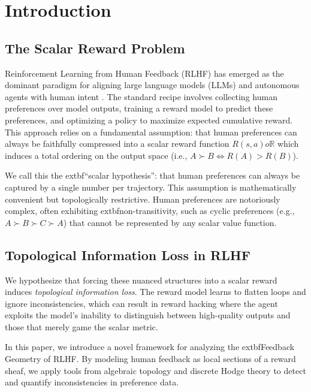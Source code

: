 \section{Introduction}
\label{sec:intro}

\subsection{The Scalar Reward Problem}

Reinforcement Learning from Human Feedback (RLHF) has emerged as the dominant paradigm for aligning large language models (LLMs) and autonomous agents with human intent \citep{christiano2017deep, ouyang2022training}. The standard recipe involves collecting human preferences over model outputs, training a reward model to predict these preferences, and optimizing a policy to maximize expected cumulative reward. This approach relies on a fundamental assumption: that human preferences can always be faithfully compressed into a scalar reward function $R(s,a) 	o \mathbb{R}$ which induces a total ordering on the output space (i.e., $A \succ B \iff R(A) > R(B)$).

We call this the 	extbf{``scalar hypothesis''}: that human preferences can always be captured by a single number per trajectory. This assumption is mathematically convenient but topologically restrictive. Human preferences are notoriously complex, often exhibiting 	extbf{non-transitivity}, such as cyclic preferences (e.g., $A \succ B \succ C \succ A$) that cannot be represented by any scalar value function.

\subsection{Topological Information Loss in RLHF}

We hypothesize that forcing these nuanced structures into a scalar reward induces \emph{topological information loss}. The reward model learns to flatten loops and ignore inconsistencies, which can result in reward hacking where the agent exploits the model's inability to distinguish between high-quality outputs and those that merely game the scalar metric. 

In this paper, we introduce a novel framework for analyzing the 	extbf{Feedback Geometry} of RLHF. By modeling human feedback as local sections of a reward sheaf, we apply tools from algebraic topology and discrete Hodge theory to detect and quantify inconsistencies in preference data.

